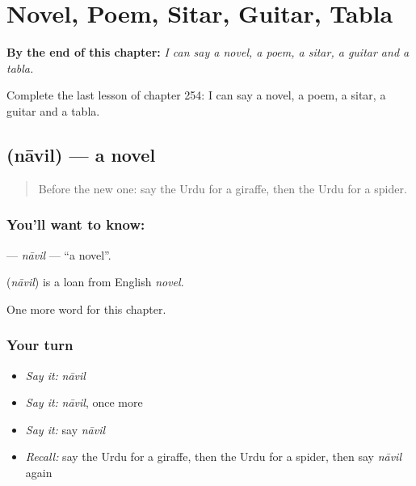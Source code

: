 
\chapter{Novel, Poem, Sitar, Guitar, Tabla}
\label{ch:ur-novel-poem-sitar-guitar-tabla}

\begin{chapteropening}
\textbf{By the end of this chapter:} \emph{I can say a novel, a poem, a sitar, a guitar and a tabla.}

Complete the last lesson of chapter 254: I can say a novel, a poem, a sitar, a guitar and a tabla.
\end{chapteropening}

\section[\texorpdfstring{\ur{ناول} (nāvil)}{ناول (nāvil)}]{ (nāvil) — a novel}

\label{lesson:UR-C254-navil}



\begin{quote}
Before the new one: say the Urdu for a giraffe, then the Urdu for a spider.
\end{quote}

\subsection*{You'll want to know: }
\textbf{} — \emph{nāvil} — \textquotedblleft{}a novel\textquotedblright{}.

\begin{cousinweb}
\textbf{} (\emph{nāvil}) is a loan from English \emph{novel}.
\end{cousinweb}

\begin{grammarlens}[title={What you've built}]
One more word for this chapter.
\end{grammarlens}

\subsection*{Your turn}
\begin{itemize}
\raggedright
  \item \emph{Say it:} \emph{nāvil}
  \item \emph{Say it:} \emph{nāvil}, once more
  \item \emph{Say it:} say \emph{nāvil}
  \item \emph{Recall:} say the Urdu for a giraffe, then the Urdu for a spider, then say \emph{nāvil} again
\end{itemize}

